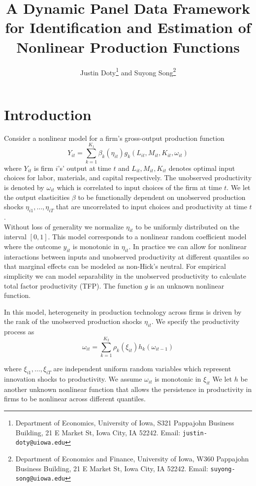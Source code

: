 \documentclass{article}
\title{A Dynamic Panel Data Framework for Identification and Estimation of Nonlinear Production Functions}
\author{Justin Doty\thanks{Department of Economics, University of Iowa, S321 Pappajohn Business Building, 21 E Market St, Iowa City, IA 52242. Email: \texttt{justin-doty@uiowa.edu}} and Suyong Song\thanks{Department of Economics and Finance, University of Iowa, W360 Pappajohn Business Building, 21 E Market St, Iowa City, IA 52242. Email: \texttt{suyong-song@uiowa.edu}}
}
\date{\vspace{-5ex}}
\begin{document}
\maketitle{} 
\section{Introduction}

Consider a nonlinear model for a firm's gross-output production function
\begin{equation}\label{modely}
Y_{it}=\sum_{k=1}^{K_{1}}\beta_{k}(\eta_{it})g_{k}(L_{it}, M_{it}, K_{it}, \omega_{it})
\end{equation}
where $Y_{it}$ is firm $i$'s' output at time $t$ and $L_{it}, M_{it}, K_{it}$ denotes optimal input choices for labor, materials, and capital respectively. The unobserved productivity is denoted by $\omega_{it}$ which is correlated to input choices of the firm at time $t$. We let the output elasticities $\beta$ to be functionally dependent on unobserved production shocks $\eta_{i1},\dots, \eta_{iT}$ that are uncorrelated to input choices and productivity at time $t$.\\

Without loss of generality we normalize $\eta_{it}$ to be uniformly distributed on the interval $[0,1]$. This model corresponds to a nonlinear random coefficient model where the outcome $y_{it}$ is monotonic in $\eta_{it}$. In practice we can allow for nonlinear interactions between inputs and unobserved productivity at different quantiles so that marginal effects can be modeled as non-Hick's neutral. For empirical simplicity we can model separability in the unobserved productivity to calculate total factor productivity (TFP). The function $g$ is an unknown nonlinear function.

In this model, heterogeneity in production technology across firms is driven by the rank of the unobserved production shocks $\eta_{it}$. We specify the productivity process as
\begin{equation}\label{modelw}
\omega_{it}=\sum_{k=1}^{K_{2}}\rho_{k}(\xi_{it})h_{k}(\omega_{it-1})
\end{equation}

where $\xi_{i1},\dots, \xi_{iT}$ are independent uniform random variables which represent innovation shocks to productivity. We assume $\omega_{it}$ is monotonic in $\xi_{it}$ We let $h$ be another unknown nonlinear function that allows the persistence in productivity in firms to be nonlinear across different quantiles.
\end{document}
